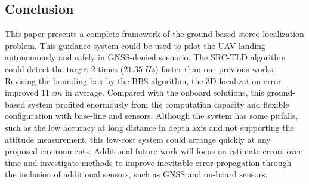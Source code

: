 



\subsection{Conclusion}
This paper presents a complete framework of the ground-based stereo localization problem. This guidance system could be used to pilot the UAV landing autonomously and safely in GNSS-denied scenario. The SRC-TLD algorithm could detect the target 2 times ($21.35\ Hz$) faster than our previous works. Revising the bounding box by the BBS algorithm, the 3D localization error improved $11\ cm$ in average. Compared with the onboard solutions, this ground-based system profited enormously from the computation capacity and flexible configuration with base-line and sensors. Although the system has some pitfalls, such as the low accuracy at long distance in depth axis and not supporting the attitude measurement, this low-cost system could arrange quickly at any proposed environments. Additional future work will focus on estimate errors over time and investigate methods to improve inevitable error propagation through the inclusion of additional sensors, such as GNSS and on-board sensors.

